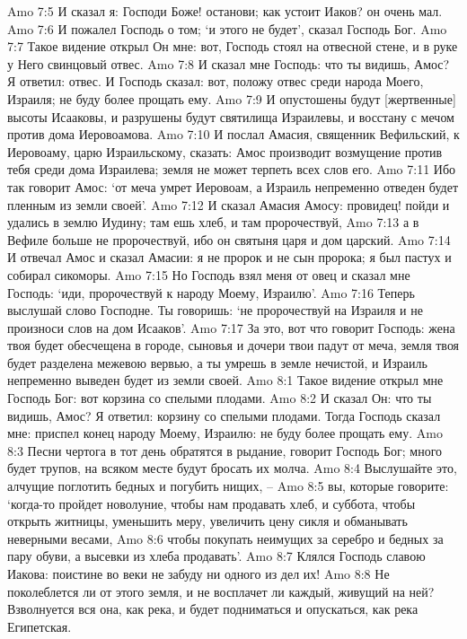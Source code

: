 Amo 7:5  И сказал я: Господи Боже! останови; как устоит Иаков? он очень мал.
Amo 7:6  И пожалел Господь о том; `и этого не будет', сказал Господь Бог.
Amo 7:7  Такое видение открыл Он мне: вот, Господь стоял на отвесной стене, и в руке у Него свинцовый отвес.
Amo 7:8  И сказал мне Господь: что ты видишь, Амос? Я ответил: отвес. И Господь сказал: вот, положу отвес среди народа Моего, Израиля; не буду более прощать ему.
Amo 7:9  И опустошены будут [жертвенные] высоты Исааковы, и разрушены будут святилища Израилевы, и восстану с мечом против дома Иеровоамова.
Amo 7:10  И послал Амасия, священник Вефильский, к Иеровоаму, царю Израильскому, сказать: Амос производит возмущение против тебя среди дома Израилева; земля не может терпеть всех слов его.
Amo 7:11  Ибо так говорит Амос: `от меча умрет Иеровоам, а Израиль непременно отведен будет пленным из земли своей'.
Amo 7:12  И сказал Амасия Амосу: провидец! пойди и удались в землю Иудину; там ешь хлеб, и там пророчествуй,
Amo 7:13  а в Вефиле больше не пророчествуй, ибо он святыня царя и дом царский.
Amo 7:14  И отвечал Амос и сказал Амасии: я не пророк и не сын пророка; я был пастух и собирал сикоморы.
Amo 7:15  Но Господь взял меня от овец и сказал мне Господь: `иди, пророчествуй к народу Моему, Израилю'.
Amo 7:16  Теперь выслушай слово Господне. Ты говоришь: `не пророчествуй на Израиля и не произноси слов на дом Исааков'.
Amo 7:17  За это, вот что говорит Господь: жена твоя будет обесчещена в городе, сыновья и дочери твои падут от меча, земля твоя будет разделена межевою вервью, а ты умрешь в земле нечистой, и Израиль непременно выведен будет из земли своей.
Amo 8:1  Такое видение открыл мне Господь Бог: вот корзина со спелыми плодами.
Amo 8:2  И сказал Он: что ты видишь, Амос? Я ответил: корзину со спелыми плодами. Тогда Господь сказал мне: приспел конец народу Моему, Израилю: не буду более прощать ему.
Amo 8:3  Песни чертога в тот день обратятся в рыдание, говорит Господь Бог; много будет трупов, на всяком месте будут бросать их молча.
Amo 8:4  Выслушайте это, алчущие поглотить бедных и погубить нищих, --
Amo 8:5  вы, которые говорите: `когда-то пройдет новолуние, чтобы нам продавать хлеб, и суббота, чтобы открыть житницы, уменьшить меру, увеличить цену сикля и обманывать неверными весами,
Amo 8:6  чтобы покупать неимущих за серебро и бедных за пару обуви, а высевки из хлеба продавать'.
Amo 8:7  Клялся Господь славою Иакова: поистине во веки не забуду ни одного из дел их!
Amo 8:8  Не поколеблется ли от этого земля, и не восплачет ли каждый, живущий на ней? Взволнуется вся она, как река, и будет подниматься и опускаться, как река Египетская.
